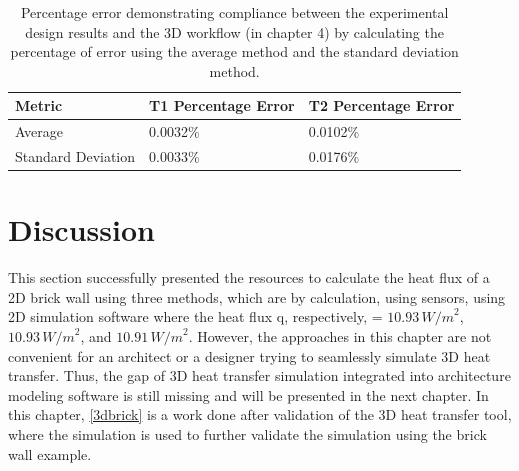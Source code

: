 \begin{table}[H]
\caption[2D Results Percentage error]{Percentage error demonstrating compliance between the experimental design results and the 3D workflow (in chapter 4) by calculating the percentage of error using the average method and the standard deviation method.}
    \label{error2d}
     \centering
 \begin{tabular}{l l l}
        \toprule
        Metric & T1 Percentage Error & T2 Percentage Error \\
        \midrule
        Average & 0.0032\% & 0.0102\% \\
        Standard Deviation & 0.0033\% & 0.0176\% \\
        \bottomrule
    \end{tabular}
\end{table}

\section{Discussion}
This section successfully presented the resources to calculate the heat flux of a 2D brick wall using three methods, which are by calculation, using sensors, using 2D simulation software where the heat flux q, respectively, = \( 10.93 \, {W/m}^2 \), \( 10.93 \, {W/m}^2 \), and \( 10.91 \, {W/m}^2 \). However, the approaches in this chapter are not convenient for an architect or a designer trying to seamlessly simulate 3D heat transfer. Thus, the gap of 3D heat transfer simulation integrated into architecture modeling software is still missing and will be presented in the next chapter. In this chapter, \ref{3dbrick} is a work done after validation of the 3D heat transfer tool, where the simulation is used to further validate the simulation using the brick wall example.